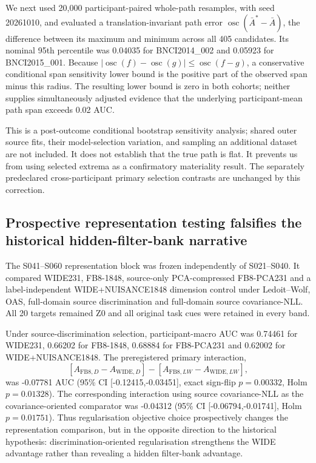 We next used 20,000 participant-paired whole-path resamples, with seed
20261010, and evaluated a translation-invariant path error
\(\operatorname{osc}(\bar A^*-\bar A)\), the difference between its maximum
and minimum across all 405 candidates. Its nominal 95th percentile was
0.04035 for BNCI2014\_002 and 0.05923 for BNCI2015\_001.
Because \(|\operatorname{osc}(f)-\operatorname{osc}(g)|
\leq\operatorname{osc}(f-g)\), a conservative conditional span sensitivity
lower bound is the positive part of the observed span minus this radius.
The resulting lower bound is zero in both cohorts; neither supplies
simultaneously adjusted evidence that the underlying participant-mean
path span exceeds 0.02 AUC.

This is a post-outcome conditional bootstrap sensitivity analysis; shared
outer source fits, their model-selection variation, and sampling an
additional dataset are not included. It does not establish that the true
path is flat. It prevents us from using selected extrema as a confirmatory
materiality result. The separately predeclared cross-participant primary
selection contrasts are unchanged by this correction.

\subsection{Prospective representation testing falsifies the historical hidden-filter-bank narrative}
The S041--S060 representation block was frozen independently of S021--S040.
It compared WIDE231, FB8-1848, source-only PCA-compressed FB8-\allowbreak PCA231 and a
label-independent WIDE+\allowbreak NUISANCE1848 dimension control under Ledoit--Wolf,
OAS, full-domain source discrimination and full-domain source covariance-NLL.
All 20 targets remained Z0 and all original task cues were retained in every
band.

Under source-discrimination selection, participant-macro AUC was 0.74461 for
WIDE231, 0.66202 for FB8-1848, 0.68884 for FB8-\allowbreak PCA231 and 0.62002 for
WIDE+\allowbreak NUISANCE1848. The preregistered primary interaction,
\[
 [A_{\mathrm{FB8},D}-A_{\mathrm{WIDE},D}]
 -
 [A_{\mathrm{FB8},LW}-A_{\mathrm{WIDE},LW}],
\]
was -0.07781 AUC (95\% CI [-0.12415,-0.03451], exact sign-flip
\(p=0.00332\), Holm \(p=0.01328\)). The corresponding interaction using
source covariance-NLL as the covariance-oriented comparator was -0.04312
(95\% CI [-0.06794,-0.01741], Holm \(p=0.01751\)). Thus regularisation
objective choice prospectively changes the representation comparison, but in
the opposite direction to the historical hypothesis: discrimination-oriented
regularisation strengthens the WIDE advantage rather than revealing a hidden
filter-bank advantage.


